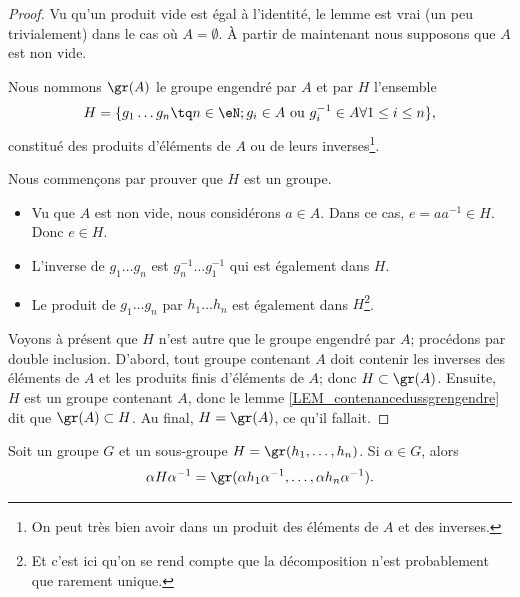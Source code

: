\begin{proof}
    Vu qu'un produit vide est égal à l'identité, le lemme est vrai (un peu trivialement) dans le cas où \( A=\emptyset\). À partir de maintenant nous supposons que \( A\) est non vide.

    Nous nommons \( \gr(A)\) le groupe engendré par \( A\) et par \( H\) l'ensemble
    \begin{equation}
        H=\{ g_1\ldots g_n\tq n \in \eN;  g_i\in A \text{ ou } g_i^{-1} \in A \forall 1 \leq i \leq n\},
    \end{equation}
    constitué des produits d'éléments de \( A \) ou de leurs inverses\footnote{On peut très bien avoir dans un produit des éléments de $A$ et des inverses.}.
    
    Nous commençons par prouver que \( H\) est un groupe.
    \begin{itemize}
        \item Vu que \( A\) est non vide, nous considérons \( a\in A\). Dans ce cas, \( e=aa^{-1}\in H\). Donc \( e\in H\).
        \item L'inverse de \( g_1\ldots g_n\) est \( g_n^{-1}\ldots g_1^{-1}\) qui est également dans \( H\).
        \item Le produit de \( g_1\ldots g_n\) par \( h_1\ldots h_n\) est également dans \( H\)\footnote{Et c'est ici qu'on se rend compte que la décomposition n'est probablement que rarement unique.}.
    \end{itemize}
    
    Voyons à présent que \( H \) n'est autre que le groupe engendré par \( A \); procédons par double inclusion. D'abord, tout groupe contenant \( A\) doit contenir les inverses des éléments de \( A \) et les produits finis d'éléments de \( A \); donc \( H\subset \gr(A)\). Ensuite, \( H\) est un groupe contenant \( A\), donc le lemme \ref{LEM_contenancedussgrengendre} dit que \( \gr(A)\subset H\). Au final, \( H=\gr(A)\), ce qu'il fallait.
\end{proof}

\begin{lemma}       \label{LEMooCFTVooKvmyKN}
    Soit un groupe \( G\) et un sous-groupe \( H=\gr(h_1,\ldots, h_n)\). Si \( \alpha\in G\), alors
    \begin{equation}
        \alpha H\alpha^{-1}=\gr(\alpha h_1\alpha^{-1},\ldots, \alpha h_n\alpha^{-1}).
    \end{equation}
\end{lemma}

